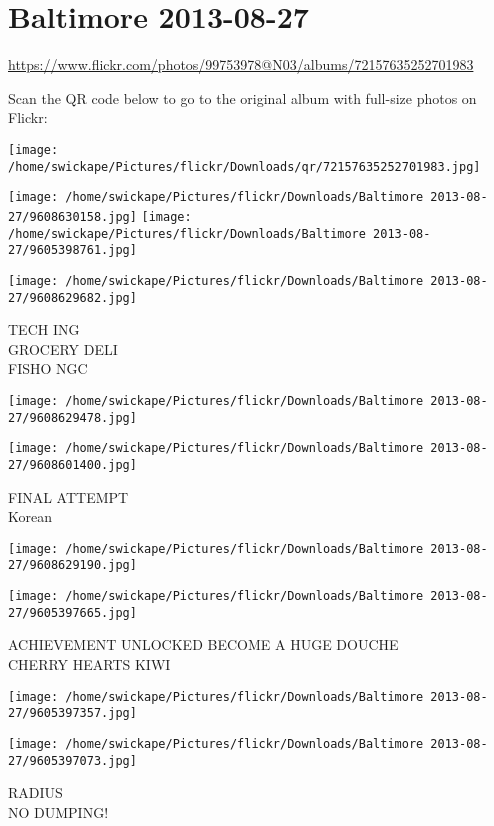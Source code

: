 \documentclass[10pt,letterpaper]{article}
\title{}
\author{}
\date{}
\begin{document}
\section*{Baltimore 2013-08-27}

\url{https://www.flickr.com/photos/99753978@N03/albums/72157635252701983}

Scan the QR code below to go to the original album with full-size photos on Flickr:

\texttt{[image: /home/swickape/Pictures/flickr/Downloads/qr/72157635252701983.jpg]}
\pagebreak

\texttt{[image: /home/swickape/Pictures/flickr/Downloads/Baltimore 2013-08-27/9608630158.jpg]}
\texttt{[image: /home/swickape/Pictures/flickr/Downloads/Baltimore 2013-08-27/9605398761.jpg]}

\texttt{[image: /home/swickape/Pictures/flickr/Downloads/Baltimore 2013-08-27/9608629682.jpg]}

TECH ING\\
GROCERY DELI\\
FISHO NGC
\pagebreak

\texttt{[image: /home/swickape/Pictures/flickr/Downloads/Baltimore 2013-08-27/9608629478.jpg]}

\vspace{0.25in}
\texttt{[image: /home/swickape/Pictures/flickr/Downloads/Baltimore 2013-08-27/9608601400.jpg]}

FINAL ATTEMPT\\
Korean
\pagebreak

\texttt{[image: /home/swickape/Pictures/flickr/Downloads/Baltimore 2013-08-27/9608629190.jpg]}

\vspace{0.25in}
\texttt{[image: /home/swickape/Pictures/flickr/Downloads/Baltimore 2013-08-27/9605397665.jpg]}

ACHIEVEMENT UNLOCKED BECOME A HUGE DOUCHE\\
CHERRY HEARTS KIWI
\pagebreak

\texttt{[image: /home/swickape/Pictures/flickr/Downloads/Baltimore 2013-08-27/9605397357.jpg]}

\vspace{0.25in}
\texttt{[image: /home/swickape/Pictures/flickr/Downloads/Baltimore 2013-08-27/9605397073.jpg]}

RADIUS\\
NO DUMPING!
\pagebreak
\end{document}
